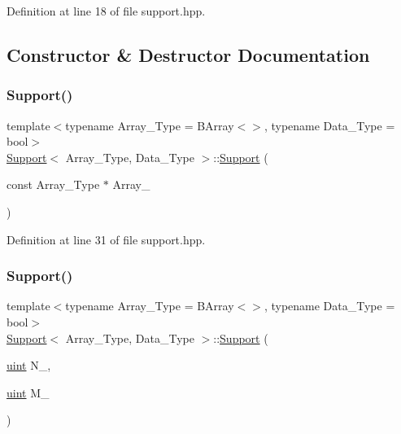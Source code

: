 Definition at line 18 of file support.\+hpp.



\subsection{Constructor \& Destructor Documentation}
\mbox{\label{class_support_a4a0587bc6f1f268005a94fea039ea6ba}} 
\subsubsection{\texorpdfstring{Support()}{Support()}\hspace{0.1cm}{\footnotesize\ttfamily [1/2]}}
{\footnotesize\ttfamily template$<$typename Array\+\_\+\+Type  = B\+Array$<$$>$, typename Data\+\_\+\+Type  = bool$>$ \\
\hyperlink{class_support}{Support}$<$ Array\+\_\+\+Type, Data\+\_\+\+Type $>$\+::\hyperlink{class_support}{Support} (\begin{DoxyParamCaption}\item[{const Array\+\_\+\+Type $\ast$}]{Array\+\_\+ }\end{DoxyParamCaption})\hspace{0.3cm}{\ttfamily [inline]}}



Definition at line 31 of file support.\+hpp.

\mbox{\label{class_support_aff7d2705d6f765fcbd8958453b7dbefe}} 
\subsubsection{\texorpdfstring{Support()}{Support()}\hspace{0.1cm}{\footnotesize\ttfamily [2/2]}}
{\footnotesize\ttfamily template$<$typename Array\+\_\+\+Type  = B\+Array$<$$>$, typename Data\+\_\+\+Type  = bool$>$ \\
\hyperlink{class_support}{Support}$<$ Array\+\_\+\+Type, Data\+\_\+\+Type $>$\+::\hyperlink{class_support}{Support} (\begin{DoxyParamCaption}\item[{\hyperlink{typedefs_8hpp_a91ad9478d81a7aaf2593e8d9c3d06a14}{uint}}]{N\+\_\+,  }\item[{\hyperlink{typedefs_8hpp_a91ad9478d81a7aaf2593e8d9c3d06a14}{uint}}]{M\+\_\+ }\end{DoxyParamCaption})\hspace{0.3cm}{\ttfamily [inline]}}



